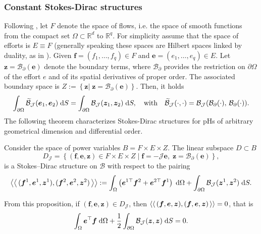 \subsubsection{Constant Stokes-Dirac structures}
Following \cite{macchelli2005modelling}, let ${F}$ denote the space of flows, i.e. the space of smooth functions from the compact set $\Omega \subset \mathbb{R}^d$ to $\mathbb{R}^q$. For simplicity assume that  the space of efforts is ${E} \equiv {F}$ (generally speaking these spaces are Hilbert spaces linked by duality, as in \cite{villegas2007}). Given $\bm{f} = (f_1, \dots, f_q) \in {F}$ and $\bm{e} = (e_1, \dots, e_q) \in {E}$. Let $\bm{z} = \mathcal{B}_\partial(\bm{e})$ denote the boundary terms, where $\mathcal{B}_\partial$ provides the restriction on $\partial\Omega$ of the effort $e$ and of its spatial derivatives of proper order. The associated boundary space is ${Z} := \left\{ \bm{z} \vert \; \bm{z} = \mathcal{B}_{\partial}(\bm{e})  \right\}$. Then, it holds
\begin{equation}
\int_{\partial \Omega} \widetilde{\mathcal{B}}_{\mathcal{J}}(\bm{e}_1, \bm{e}_2) \d{S} = \int_{\partial \Omega} \mathcal{B}_{\mathcal{J}}(\bm{z}_1, \bm{z}_2) \d{S}, \quad \text{with} \quad  \widetilde{\mathcal{B}}_\mathcal{J}(\cdot, \cdot) = \mathcal{B}_{\mathcal{J}}(\mathcal{B}_{\partial}(\cdot), \, \mathcal{B}_{\partial}(\cdot)).
\end{equation}
The following theorem characterizes Stokes-Dirac structures for pHs of arbitrary geometrical dimension and differential order.
\begin{proposition}
	\label{prop:StokesDirac}
	
	Consider the space of power variables ${B} = {F} \times {E} \times {Z}$. The linear subspace ${D} \subset {B}$
	\begin{equation}
	{D}_{\mathcal{J}} = \left\{ (\bm{f}, \bm{e}, \bm{z}) \in  {F} \times {E} \times {Z} \; \vert \; \bm{f} = -\mathcal{J} \bm{e}, \; \bm{z} = \mathcal{B}_\partial(\bm{e}) \right\},
	\end{equation}
	is a Stokes–Dirac structure on $\mathcal{B}$ with respect to the pairing
	\begin{equation}
	\bilprod{(\bm{f}^1, \bm{e}^1, \bm{z}^1)}{(\bm{f}^2, \bm{e}^2, \bm{z}^2)}  := \int_{\Omega} \left( \bm{e}^{1 \top} \bm{f}^ 2 + \bm{e}^{2 \top} \bm{f}^1 \right) \d\Omega + \int_{\partial \Omega} \mathcal{B}_{\mathcal{J}}(\bm{z}^1, \bm{z}^2) \d{S}.
	\end{equation}
\end{proposition}
From this proposition, if $(\bm{f}, \bm{e}, \bm{z}) \in  D_{\mathcal{J}}$, then $\left\langle \left\langle \, (\bm{f}, \bm{e}, \bm{z}), (\bm{f}, \bm{e}, \bm{z}) \, \right\rangle \right\rangle=0$, that is
\begin{equation}\label{eq:enbalstr}
\int_{\Omega} \bm{e}^\top \bm{f}  \d\Omega + \frac{1}{2} \int_{\partial \Omega} \mathcal{B}_{\mathcal{J}}(\bm{z}, \bm{z}) \d{S} = 0.
\end{equation}


